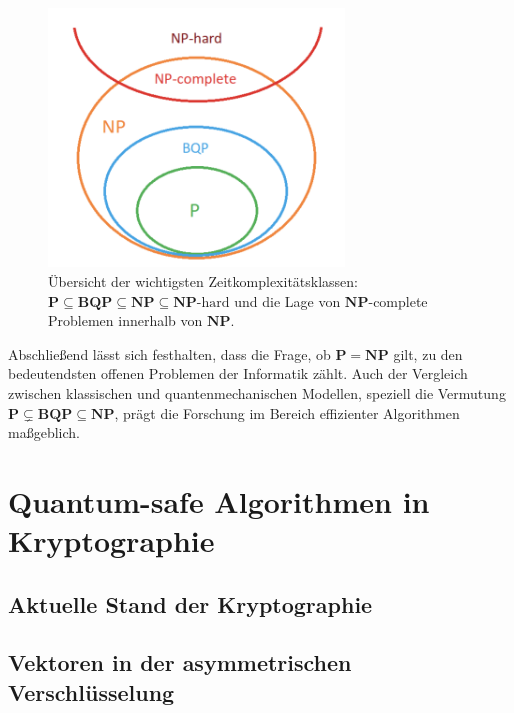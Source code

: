 \begin{figure}[h]
  \centering
  \includegraphics[width=0.7\textwidth]{images/basic-algorithms/problem-classes.png}
  \caption{Übersicht der wichtigsten Zeitkomplexitätsklassen: \(\mathbf{P}\subseteq \mathbf{BQP}\subseteq \mathbf{NP}\subseteq \mathbf{NP}\text{-hard}\) und die Lage von \(\mathbf{NP}\)-complete Problemen innerhalb von \(\mathbf{NP}\).}
  \label{fig:problem_classes}
\end{figure}

Abschließend lässt sich festhalten, dass die Frage, ob \(\mathbf{P}=\mathbf{NP}\) gilt, zu den bedeutendsten offenen Problemen der Informatik zählt. Auch der Vergleich zwischen klassischen und quantenmechanischen Modellen, speziell die Vermutung \(\mathbf{P}\subsetneq \mathbf{BQP}\subseteq \mathbf{NP}\), prägt die Forschung im Bereich effizienter Algorithmen maßgeblich.

\section{Quantum-safe Algorithmen in Kryptographie}
\subsection{Aktuelle Stand der Kryptographie}
\subsection{Vektoren in der asymmetrischen Verschlüsselung}

\printbibliography
